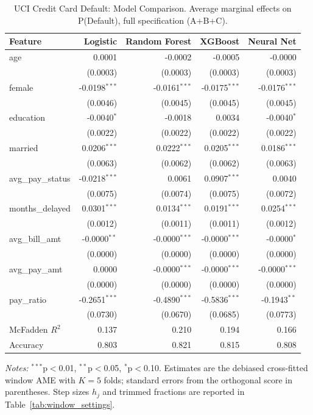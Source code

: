 \begin{table}[htbp]
\centering
\small
\begin{threeparttable}
\caption{UCI Credit Card Default: Model Comparison. Average marginal effects on P(Default), full specification (A+B+C).}
\label{tab:credit_default_model_comparison}
\begin{tabular}{lrrrr}
\toprule
Feature & Logistic & Random Forest & XGBoost & Neural Net \\
\midrule
age & 0.0001 & -0.0002 & -0.0005 & -0.0000 \\
 & (0.0003) & (0.0003) & (0.0003) & (0.0003) \\
female & -0.0198$^{***}$ & -0.0161$^{***}$ & -0.0175$^{***}$ & -0.0176$^{***}$ \\
 & (0.0046) & (0.0045) & (0.0045) & (0.0045) \\
education & -0.0040$^{*}$ & -0.0018 & 0.0034 & -0.0040$^{*}$ \\
 & (0.0022) & (0.0022) & (0.0022) & (0.0022) \\
married & 0.0206$^{***}$ & 0.0222$^{***}$ & 0.0205$^{***}$ & 0.0186$^{***}$ \\
 & (0.0063) & (0.0062) & (0.0062) & (0.0063) \\
\midrule
avg\_pay\_status & -0.0218$^{***}$ & 0.0061 & 0.0907$^{***}$ & 0.0040 \\
 & (0.0075) & (0.0074) & (0.0075) & (0.0072) \\
months\_delayed & 0.0301$^{***}$ & 0.0134$^{***}$ & 0.0191$^{***}$ & 0.0254$^{***}$ \\
 & (0.0012) & (0.0011) & (0.0011) & (0.0012) \\
\midrule
avg\_bill\_amt & -0.0000$^{**}$ & -0.0000$^{***}$ & -0.0000$^{***}$ & -0.0000$^{*}$ \\
 & (0.0000) & (0.0000) & (0.0000) & (0.0000) \\
avg\_pay\_amt & 0.0000 & -0.0000$^{***}$ & -0.0000$^{***}$ & -0.0000$^{***}$ \\
 & (0.0000) & (0.0000) & (0.0000) & (0.0000) \\
pay\_ratio & -0.2651$^{***}$ & -0.4890$^{***}$ & -0.5836$^{***}$ & -0.1943$^{**}$ \\
 & (0.0730) & (0.0670) & (0.0685) & (0.0773) \\
\midrule
McFadden $R^2$ & 0.137 & 0.210 & 0.194 & 0.166 \\
Accuracy & 0.803 & 0.821 & 0.815 & 0.808 \\
\bottomrule
\end{tabular}
\begin{tablenotes}
\footnotesize
\item \textit{Notes:} $^{***}$p$<$0.01, $^{**}$p$<$0.05, $^{*}$p$<$0.10. Estimates are the debiased cross-fitted window AME with $K=5$ folds; standard errors from the orthogonal score in parentheses. Step sizes $h_j$ and trimmed fractions are reported in Table~\ref{tab:window_settings}.
\end{tablenotes}
\end{threeparttable}
\end{table}